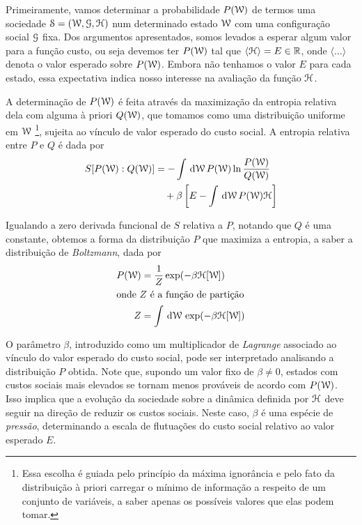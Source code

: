 Primeiramente, vamos determinar a probabilidade $P(\mathcal{W})$ de termos
uma sociedade $\mathcal{S} = (\mathcal{W}, \mathcal{G}, {\mathcal{H}})$ num determinado estado $\mathcal{W}$ com uma configuração social $\mathcal{G}$ fixa.
Dos argumentos apresentados, somos levados a esperar algum valor para a função custo, ou seja devemos ter $P(\mathcal{W})$ tal que $\langle{\mathcal{H}}\rangle=E \in \mathbb{R}$, onde $\langle\dots\rangle$ denota o valor esperado sobre $P(\mathcal{W})$.
Embora não tenhamos o valor $E$ para cada estado, essa expectativa indica nosso interesse na avaliação da função ${\mathcal{H}}$.

A determinação de $P(\mathcal{W})$ é feita através da maximização da entropia relativa dela com alguma à priori $Q(\mathcal{W})$, que tomamos como uma distribuição uniforme em $\mathcal{W}$ \footnote{Essa escolha é guiada pelo princípio da máxima ignorância e pelo fato da distribuição à priori carregar o mínimo de informação a respeito de um conjunto de variáveis, a saber apenas os possíveis valores que elas podem tomar.}, sujeita ao vínculo de valor esperado do custo social.
A entropia relativa entre $P$ e $Q$ é dada por
\begin{align}\label{eq:ent-Pw}
  S[P(\MM):Q(\MM)] & = -\int \msr{\MM} P(\MM) \ln \frac{P(\MM)}{Q(\MM)} \notag \\
                   & \quad + \beta \inbk{E - \int \msr{\MM} P(\MM)\cost}
\end{align}

Igualando a zero derivada funcional de $S$ relativa a $P$, notando que $Q$ é uma constante, obtemos a forma da distribuição $P$ que maximiza a entropia, a saber a distribuição de \emph{Boltzmann}, dada por
\begin{align}
  P(\MM) & = \frac{1}{Z} \exp (-\beta \cost [\MM]) \label{eq:Pw} \\
\intertext{onde $Z$ é a função de partição}
  Z & = \int \msr{\MM} \exp (-\beta \cost [\MM]) \label{eq:Zw}
\end{align}

O parâmetro $\beta$, introduzido como um multiplicador de \emph{Lagrange} associado ao vínculo do valor esperado do custo social, pode ser interpretado analisando a distribuição $P$ obtida.
Note que, supondo um valor fixo de $\beta \neq 0$, estados com custos sociais mais elevados se tornam menos prováveis de acordo com $P(\mathcal{W})$.
Isso implica que a evolução da sociedade sobre a dinâmica definida por ${\mathcal{H}}$ deve seguir na direção de reduzir os custos sociais. Neste caso, $\beta$ é uma espécie de \emph{pressão}, determinando a escala de flutuações do custo social relativo ao valor esperado $E$.

